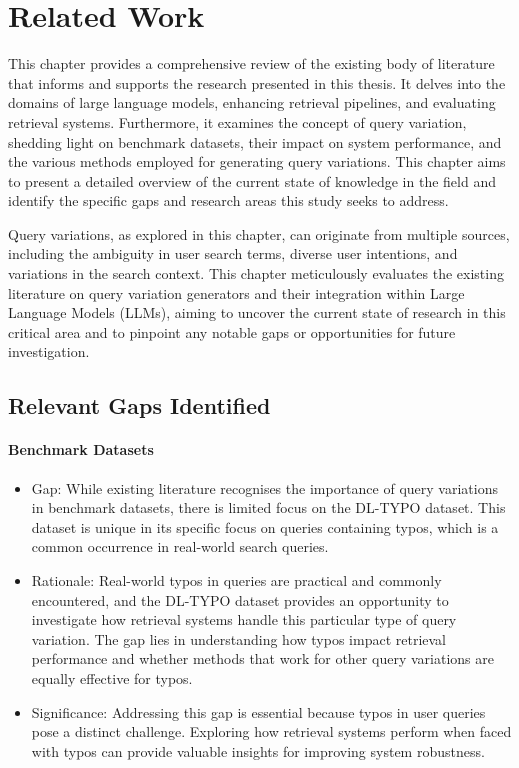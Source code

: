\chapter{Related Work}
This chapter provides a comprehensive review of the existing body of literature that informs and supports the research presented in this thesis. It delves into the domains of large language models, enhancing retrieval pipelines, and evaluating retrieval systems. Furthermore, it examines the concept of query variation, shedding light on benchmark datasets, their impact on system performance, and the various methods employed for generating query variations. This chapter aims to present a detailed overview of the current state of knowledge in the field and identify the specific gaps and research areas this study seeks to address.

Query variations, as explored in this chapter, can originate from multiple sources, including the ambiguity in user search terms, diverse user intentions, and variations in the search context. This chapter meticulously evaluates the existing literature on query variation generators and their integration within Large Language Models (LLMs), aiming to uncover the current state of research in this critical area and to pinpoint any notable gaps or opportunities for future investigation.




\section{Relevant Gaps Identified}
\subsubsection{Benchmark Datasets}
\begin{itemize}
    \item Gap: While existing literature recognises the importance of query variations in benchmark datasets, there is limited focus on the DL-TYPO dataset. This dataset is unique in its specific focus on queries containing typos, which is a common occurrence in real-world search queries.
    \item Rationale: Real-world typos in queries are practical and commonly encountered, and the DL-TYPO dataset provides an opportunity to investigate how retrieval systems handle this particular type of query variation. The gap lies in understanding how typos impact retrieval performance and whether methods that work for other query variations are equally effective for typos.
    \item Significance: Addressing this gap is essential because typos in user queries pose a distinct challenge. Exploring how retrieval systems perform when faced with typos can provide valuable insights for improving system robustness.
\end{itemize}

